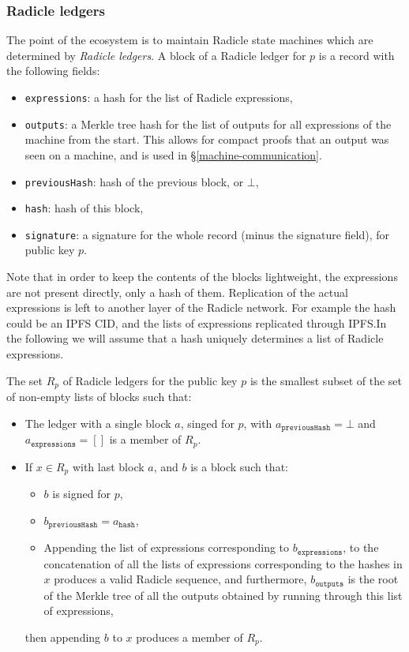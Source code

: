 \documentclass[a4paper, oneside, 10pt]{amsart}
\begin{document}
\subsubsection{Radicle ledgers}

The point of the ecosystem is to maintain Radicle state machines which are
determined by \emph{Radicle ledgers}. A block of a Radicle ledger for $p$ is a
record with the following fields:
\begin{itemize}
\item
  \texttt{expressions}: a hash for the list of Radicle expressions,
\item
  \texttt{outputs}: a Merkle tree hash for the list of outputs for all
  expressions of the machine from the start. This allows for compact proofs that
  an output was seen on a machine, and is used in \S\ref{machine-communication}.
\item
  \texttt{previousHash}: hash of the previous block, or $\bot$,
\item
  \texttt{hash}: hash of this block,
\item
  \texttt{signature}: a signature for the whole record (minus the signature
  field), for public key $p$.
\end{itemize}

Note that in order to keep the contents of the blocks lightweight, the
expressions are not present directly, only a hash of them. Replication of the
actual expressions is left to another layer of the Radicle network. For example
the hash could be an IPFS CID, and the lists of expressions replicated through
IPFS.\@ In the following we will assume that a hash uniquely determines a list
of Radicle expressions.

The set $R_p$ of Radicle ledgers for the public key $p$ is the smallest subset
of the set of non-empty lists of blocks such that:
\begin{itemize}
\item
  The ledger with a single block $a$, singed for $p$, with
  $a_\mathtt{previousHash} = \bot$ and $a_\mathtt{expressions} = []$ is a member
  of $R_p$.
\item
  If $x \in R_p$ with last block $a$, and $b$ is a block such that:
  \begin{itemize}
  \item
    $b$ is signed for $p$,
  \item
    $b_\mathtt{previousHash} = a_\mathtt{hash}$,
  \item
    Appending the list of expressions corresponding to $b_\mathtt{expressions}$,
    to the concatenation of all the lists of expressions corresponding to the
    hashes in $x$ produces a valid Radicle sequence, and furthermore,
    $b_\mathtt{outputs}$ is the root of the Merkle tree of all the outputs
    obtained by running through this list of expressions,
  \end{itemize}
  then appending $b$ to $x$ produces a member of $R_p$.
\end{itemize}
\end{document}
